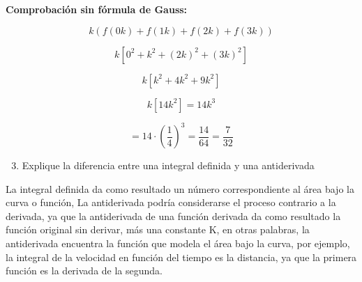 \textbf{Comprobación sin fórmula de Gauss:}

\[
k (f(0k) + f(1k) + f(2k) + f(3k))
\]

\[
k [0^2 + k^2 + (2k)^2 + (3k)^2]
\]

\[
k [k^2 + 4k^2 + 9k^2]
\]

\[
k [14k^2] = 14k^3
\]

\[
= 14 \cdot \left(\frac{1}{4}\right)^3 = \frac{14}{64} = \frac{7}{32}
\]

\begin{enumerate}
    \setcounter{enumi}{2}
    \item Explique la diferencia entre una integral definida y una antiderivada
\end{enumerate}

La integral definida da como resultado un número correspondiente al área bajo la curva o función,
La antiderivada podría considerarse el proceso contrario a la derivada, ya que la antiderivada de una
función derivada da como resultado la función original sin derivar, más una constante K, en otras palabras,
la antiderivada encuentra la función que modela el área bajo la curva, por ejemplo, la integral de la
velocidad en función del tiempo es la distancia, ya que la primera función es la derivada de la segunda.